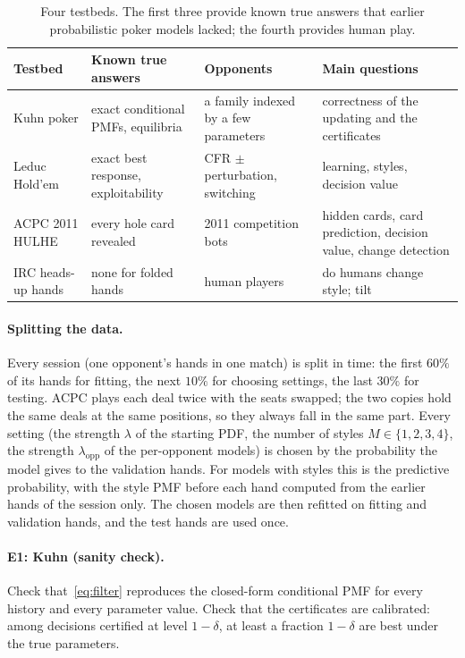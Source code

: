 \documentclass[11pt,a4paper]{article}
\newcommand{\1}{\mathbf{1}}
\begin{document}
\begin{table}[t]
\centering\small
\begin{tabular}{@{}p{2.3cm}p{3.9cm}p{3.6cm}p{4.2cm}@{}}
\toprule
Testbed & Known true answers & Opponents & Main questions\\
\midrule
Kuhn poker & exact conditional PMFs, equilibria & a family indexed by a few parameters & correctness of the updating and the certificates\\
Leduc Hold'em & exact best response, exploitability & CFR $\pm$ perturbation, switching & learning, styles, decision value\\
ACPC 2011 HULHE & every hole card revealed & 2011 competition bots & hidden cards, card prediction, decision value, change detection\\
IRC heads-up hands & none for folded hands & human players & do humans change style; tilt\\
\bottomrule
\end{tabular}
\caption{Four testbeds. The first three provide known true answers that earlier
probabilistic poker models lacked; the fourth provides human play.}
\label{tab:testbeds}
\end{table}

\paragraph{Splitting the data.} Every session (one opponent's hands in one
match) is split in time: the first $60\%$ of its hands for fitting, the next
$10\%$ for choosing settings, the last $30\%$ for testing. ACPC plays each deal
twice with the seats swapped; the two copies hold the same deals at the same
positions, so they always fall in the same part. Every setting (the strength
$\lambda$ of the starting PDF, the number of styles $M\in\{1,2,3,4\}$, the
strength $\lambda_{\text{opp}}$ of the per-opponent models) is chosen by the
probability the model gives to the validation hands. For models with styles this
is the predictive probability, with the style PMF before each hand computed from
the earlier hands of the session only. The chosen models are then refitted on
fitting and validation hands, and the test hands are used once.

\paragraph{E1: Kuhn (sanity check).} Check that~\eqref{eq:filter} reproduces the
closed-form conditional PMF for every history and every parameter value. Check
that the certificates are calibrated: among decisions certified at level
$1-\delta$, at least a fraction $1-\delta$ are best under the true parameters.
\end{document}
